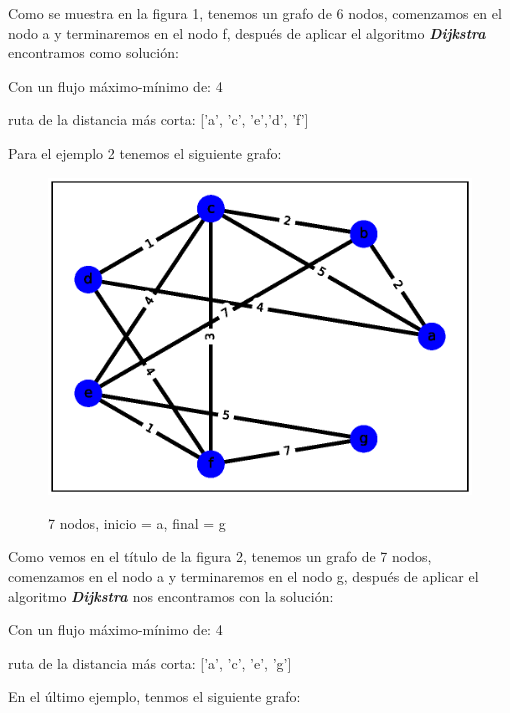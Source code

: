 \documentclass{report}
\newcommand{\dij}{{\bfseries {\textit{Dijkstra }}}}
\begin{document}
Como se muestra en la figura 1, tenemos un grafo de 6 nodos, comenzamos en el nodo a y terminaremos en el nodo f, después de aplicar el algoritmo \dij encontramos como solución:
\begin{center}
    Con un flujo máximo-mínimo de: 
    4

    ruta de la distancia más corta:
    ['a', 'c', 'e','d', 'f']
\end{center}

Para el ejemplo 2 tenemos el siguiente grafo:

\begin{figure}[h!t]
    \centering
    \includegraphics[scale = 0.35]{ejemplo2.eps}
    \label{figura2}
    \caption{7 nodos, inicio = a, final = g}
\end{figure}

Como vemos en el título de la  figura 2, tenemos un grafo de 7 nodos, comenzamos en el nodo a y terminaremos en el nodo g, después de aplicar el algoritmo  \dij nos encontramos con la solución:
\begin{center}
    Con un flujo máximo-mínimo de: 
    4

    ruta de la distancia más corta:
    ['a', 'c', 'e', 'g']
\end{center}

En el último ejemplo, tenmos el siguiente grafo:
\end{document}
